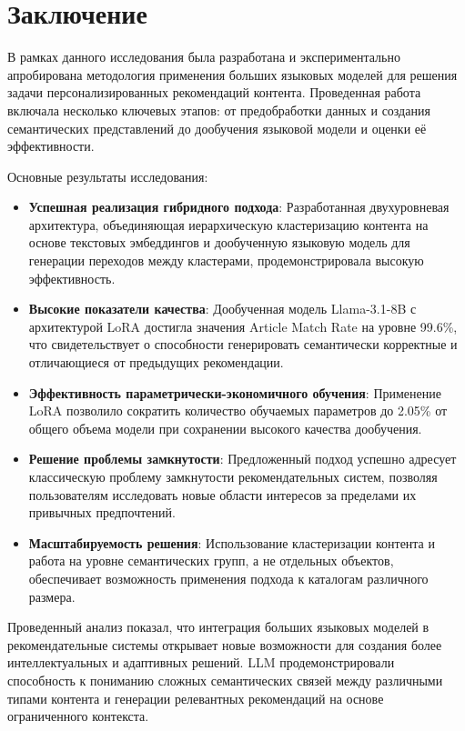 \section*{Заключение}

В рамках данного исследования была разработана и экспериментально апробирована методология применения больших языковых моделей для решения задачи персонализированных рекомендаций контента. Проведенная работа включала несколько ключевых этапов: от предобработки данных и создания семантических представлений до дообучения языковой модели и оценки её эффективности.

Основные результаты исследования:

\begin{itemize}
    \item \textbf{Успешная реализация гибридного подхода}: Разработанная двухуровневая архитектура, объединяющая иерархическую кластеризацию контента на основе текстовых эмбеддингов и дообученную языковую модель для генерации переходов между кластерами, продемонстрировала высокую эффективность.
    
    \item \textbf{Высокие показатели качества}: Дообученная модель Llama-3.1-8B с архитектурой LoRA достигла значения Article Match Rate на уровне 99.6\%, что свидетельствует о способности генерировать семантически корректные и отличающиеся от предыдущих рекомендации.
    
    \item \textbf{Эффективность параметрически-экономичного обучения}: Применение LoRA позволило сократить количество обучаемых параметров до 2.05\% от общего объема модели при сохранении высокого качества дообучения.
    
    \item \textbf{Решение проблемы замкнутости}: Предложенный подход успешно адресует классическую проблему замкнутости рекомендательных систем, позволяя пользователям исследовать новые области интересов за пределами их привычных предпочтений.
    
    \item \textbf{Масштабируемость решения}: Использование кластеризации контента и работа на уровне семантических групп, а не отдельных объектов, обеспечивает возможность применения подхода к каталогам различного размера.
\end{itemize}

Проведенный анализ показал, что интеграция больших языковых моделей в рекомендательные системы открывает новые возможности для создания более интеллектуальных и адаптивных решений. LLM продемонстрировали способность к пониманию сложных семантических связей между различными типами контента и генерации релевантных рекомендаций на основе ограниченного контекста.


